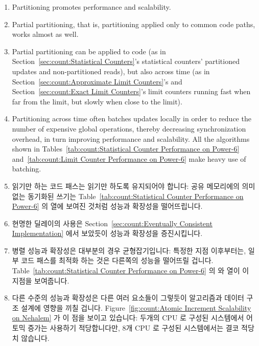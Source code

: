 \begin{enumerate}
\begin{enumerate}
\item	Partitioning promotes performance and scalability.
\item	Partial partitioning, that is, partitioning applied only to
	common code paths, works almost as well.
\item	Partial partitioning can be applied to code (as in
	Section~\ref{sec:count:Statistical Counters}'s statistical
	counters' partitioned updates and non-partitioned reads), but also
	across time (as in
	Section~\ref{sec:count:Approximate Limit Counters}'s and
	Section~\ref{sec:count:Exact Limit Counters}'s
	limit counters running fast when far from
	the limit, but slowly when close to the limit).
\item	Partitioning across time often batches updates locally
	in order to reduce the number of expensive global operations,
	thereby decreasing synchronization overhead, in turn
	improving performance and scalability.
	All the algorithms shown in
	Tables~\ref{tab:count:Statistical Counter Performance on Power-6}
	and~\ref{tab:count:Limit Counter Performance on Power-6}
	make heavy use of batching.
\fi
\item	읽기만 하는 코드 패스는 읽기만 하도록 유지되어야 합니다:  공유
	메모리에의 의미없는 동기화된 쓰기는
	Table~\ref{tab:count:Statistical Counter Performance on Power-6} 의
	 열에 보여진 것처럼 성능과 확장성을 떨어뜨립니다.
\item	현명한 딜레이의 사용은
	Section~\ref{sec:count:Eventually Consistent Implementation} 에서
	보았듯이 성능과 확장성을 증진시킵니다.
\item	병렬 성능과 확장성은 대부분의 경우 균형잡기입니다: 특정한 지점
	이후부터는, 일부 코드 패스를 최적화 하는 것은 다른쪽의 성능을 떨어뜨릴
	겁니다.
	Table~\ref{tab:count:Statistical Counter Performance on Power-6} 의
	 와  열이 이 지점을
	보여줍니다.
\item	다른 수준의 성능과 확장성은 다른 여러 요소들이 그렇듯이 알고리즘과
	데이터 구조 설계에 영향을 끼칠 겁니다.
	Figure~\ref{fig:count:Atomic Increment Scalability on Nehalem} 가 이
	점을 보이고 있습니다:  두개의 CPU 로 구성된 시스템에서 어토믹 증가는
	사용하기 적당합니다만, 8개 CPU 로 구성된 시스템에서는 결코 적당치
	않습니다.
\iffalse


\end{enumerate}
\end{enumerate}
